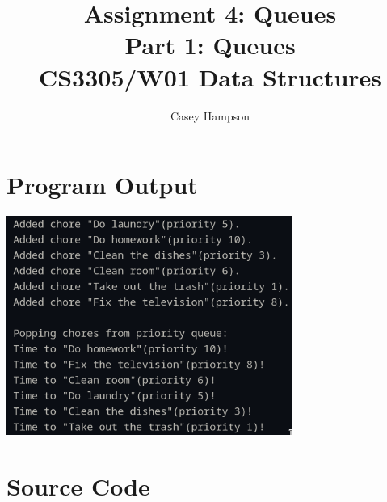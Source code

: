 \documentclass{article}
\title{Assignment 4: Queues \\[5pt] Part 1: Queues \\[8pt] CS3305/W01 Data Structures}
\author{Casey Hampson}
\begin{document}
\maketitle


\section*{Program Output}
    \begin{center}
    \includegraphics[width=0.7\textwidth]{./res/1.png}
    \end{center}





\pagebreak
\section*{Source Code}
\inputminted{java}{./P1.java}
\end{document}
